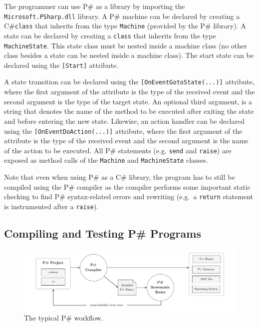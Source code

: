 \documentclass{llncs}
\newcommand{\ps}{P\#\xspace}
\newcommand{\cs}{C\#\xspace}
\begin{document}
The programmer can use \ps as a library by importing the \texttt{Microsoft.PSharp.dll} library. A \ps machine can be declared by creating a \cs \texttt{class} that inherits from the type \texttt{Machine} (provided by the \ps library). A state can be declared by creating a \texttt{class} that inherits from the type \texttt{MachineState}. This state class must be nested inside a machine class (no other class besides a state can be nested inside a machine class). The start state can be declared using the \texttt{[Start]} attribute.

A state transition can be declared using the \texttt{[OnEventGotoState(...)]} attribute, where the first argument of the attribute is the type of the received event and the second argument is the type of the target state. An optional third argument, is a string that denotes the name of the method to be executed after exiting the state and before entering the new state. Likewise, an action handler can be declared using the \texttt{[OnEventDoAction(...)]} attribute, where the first argument of the attribute is the type of the received event and the second argument is the name of the action to be executed. All \ps statements (e.g. \texttt{send} and \texttt{raise}) are exposed as method calls of the \texttt{Machine} and \texttt{MachineState} classes.

Note that even when using \ps as a \cs library, the program has to still be compiled using the \ps compiler as the compiler performs some important static checking to find \ps syntax-related errors and rewriting (e.g.\ a \texttt{return} statement is instrumented after a \texttt{raise}).

\subsection{Compiling and Testing \ps Programs}
\label{psharp:coding:compilation}

\begin{figure}[t]
\centering
\includegraphics[width=0.95\linewidth]{figures/workflow.pdf}
\caption{The typical \ps workflow.}
\label{fig:workflow}
\end{figure}
\end{document}
